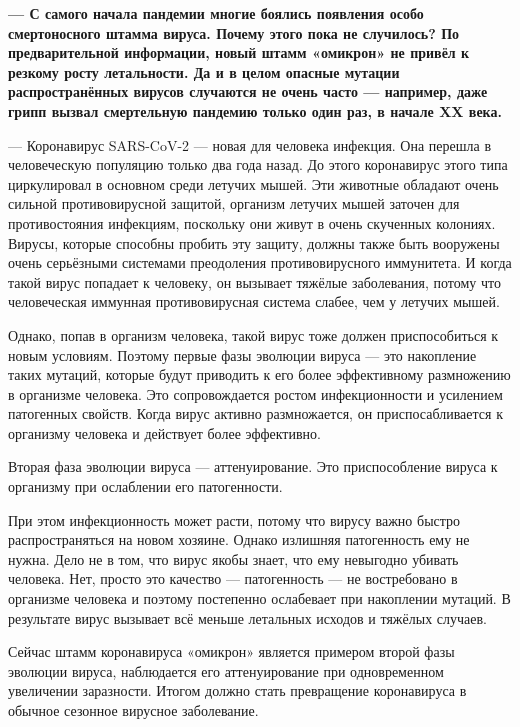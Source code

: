 {\bf --- С самого начала пандемии многие боялись появления особо смертоносного штамма вируса. Почему этого пока не случилось? По предварительной информации, новый штамм «омикрон» не привёл к резкому росту летальности. Да и в целом опасные мутации распространённых вирусов случаются не очень часто — например, даже грипп вызвал смертельную пандемию только один раз, в начале XX века. }

— Коронавирус SARS-CoV-2 — новая для человека инфекция. Она перешла в человеческую популяцию только два года назад. До этого коронавирус этого типа циркулировал в основном среди летучих мышей. Эти животные обладают очень сильной противовирусной защитой, организм летучих мышей заточен для противостояния инфекциям, поскольку они живут в очень скученных колониях. Вирусы, которые способны пробить эту защиту, должны также быть вооружены очень серьёзными системами преодоления противовирусного иммунитета. И когда такой вирус попадает к человеку, он вызывает тяжёлые заболевания, потому что человеческая иммунная противовирусная система слабее, чем у летучих мышей.

Однако, попав в организм человека, такой вирус тоже должен приспособиться к новым условиям. Поэтому первые фазы эволюции вируса — это накопление таких мутаций, которые будут приводить к его более эффективному размножению в организме человека. Это сопровождается ростом инфекционности и усилением патогенных свойств. Когда вирус активно размножается, он приспосабливается к организму человека и действует более эффективно.

Вторая фаза эволюции вируса — аттенуирование. Это приспособление вируса к организму при ослаблении его патогенности.

При этом инфекционность может расти, потому что вирусу важно быстро распространяться на новом хозяине. Однако излишняя патогенность ему не нужна. Дело не в том, что вирус якобы знает, что ему невыгодно убивать человека. Нет, просто это качество — патогенность — не востребовано в организме человека и поэтому постепенно ослабевает при накоплении мутаций. В результате вирус вызывает всё меньше летальных исходов и тяжёлых случаев.

\begin{fancyquotes}
    Сейчас штамм коронавируса «омикрон» является примером второй фазы эволюции вируса, наблюдается его аттенуирование при одновременном увеличении заразности. Итогом должно стать превращение коронавируса в обычное сезонное вирусное заболевание.
\end{fancyquotes}

